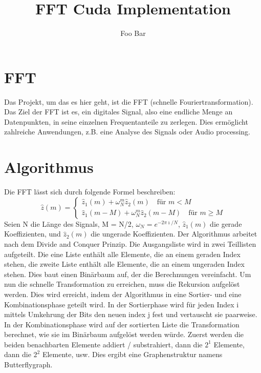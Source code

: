 \documentclass[sigconf]{acmart}
\begin{document}
\title{FFT Cuda Implementation}
\author{Foo Bar}

\renewcommand{\shortauthors}{Gehreke}

\maketitle

\section{FFT}
Das Projekt, um das es hier geht, ist die FFT (schnelle Fouriertransformation). Das Ziel der FFT ist es, ein digitales Signal, also eine endliche Menge an Datenpunkten, in seine einzelnen Frequentanteile zu zerlegen. Dies ermöglicht zahlreiche Anwendungen, z.B. eine Analyse des Signals oder Audio processing.

\section{Algorithmus}
Die FFT lässt sich durch folgende Formel beschreiben:
\[\hat{z}(m) =
  \begin{cases}
    \hat{z}_1(m) + \omega_N^m \hat{z}_2(m) \quad \text{für } m < M\\
    \hat{z}_1(m - M) + \omega_N^m \hat{z}_2(m - M) \quad \text{für } m \geq M
  \end{cases}
\]
Seien N die Länge des Signals, M = N/2, $\omega_N = e^{-2 \pi \imath / N}$, $\hat{z}_1(m)$ die gerade Koeffizienten, und $\hat{z}_2(m)$ die ungerade Koeffizienten. Der Algorithmus arbeitet nach dem Divide and Conquer Prinzip. Die Ausgangsliste wird in zwei Teillisten aufgeteilt. Die eine Liste enthält alle Elemente, die an einem geraden Index stehen, die zweite Liste enthält alle Elemente, die an einem ungeraden Index stehen. Dies baut einen Binärbaum auf, der die Berechnungen vereinfacht. Um nun die schnelle Transformation zu erreichen, muss die Rekursion aufgelöst werden. Dies wird erreicht, indem der Algorithmus in eine Sortier- und eine Kombinationsphase geteilt wird. In der Sortierphase wird für jeden Index i mittels Umkehrung der Bits den neuen index j fest und vertauscht sie paarweise. In der Kombinationsphase wird auf der sortierten Liste die Transformation berechnet, wie sie im Binärbaum aufgelöst werden würde. Zuerst werden die beiden benachbarten Elemente addiert / substrahiert, dann die $2^1$ Elemente, dann die $2^2$ Elemente, usw. Dies ergibt eine Graphenstruktur namens Butterflygraph. 
\end{document}
